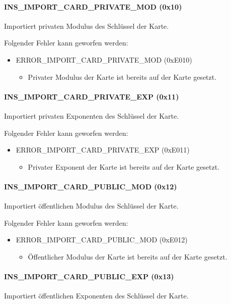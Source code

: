 \paragraph{INS\_IMPORT\_CARD\_PRIVATE\_MOD (0x10)} Importiert privaten Modulus des Schlüssel der Karte.

Folgender Fehler kann geworfen werden:
\begin{itemize}
	\item ERROR\_IMPORT\_CARD\_PRIVATE\_MOD (0xE010)
	\begin{itemize}
		\item Privater Modulus der Karte ist bereits auf der Karte gesetzt.
	\end{itemize}
\end{itemize}
\paragraph{INS\_IMPORT\_CARD\_PRIVATE\_EXP (0x11)} Importiert privaten Exponenten des Schlüssel der Karte.

Folgender Fehler kann geworfen werden:
\begin{itemize}
	\item ERROR\_IMPORT\_CARD\_PRIVATE\_EXP (0xE011)
	\begin{itemize}
		\item Privater Exponent der Karte ist bereits auf der Karte gesetzt.
	\end{itemize}
\end{itemize}
\paragraph{INS\_IMPORT\_CARD\_PUBLIC\_MOD (0x12)} Importiert öffentlichen Modulus des Schlüssel der Karte.

Folgender Fehler kann geworfen werden:
\begin{itemize}
	\item ERROR\_IMPORT\_CARD\_PUBLIC\_MOD (0xE012)
	\begin{itemize}
		\item Öffentlicher Modulus der Karte ist bereits auf der Karte gesetzt.
	\end{itemize}
\end{itemize}
\paragraph{INS\_IMPORT\_CARD\_PUBLIC\_EXP (0x13)} Importiert öffentlichen Exponenten des Schlüssel der Karte.

